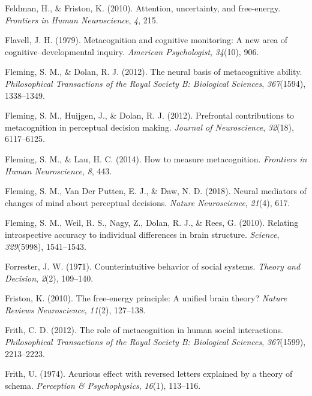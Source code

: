 \documentclass[12pt,twoside]{reedthesis}
\begin{document}
\leavevmode\hypertarget{ref-feldman2010attention}{}%
Feldman, H., \& Friston, K. (2010). Attention, uncertainty, and free-energy. \emph{Frontiers in Human Neuroscience}, \emph{4}, 215.

\leavevmode\hypertarget{ref-flavell1979metacognition}{}%
Flavell, J. H. (1979). Metacognition and cognitive monitoring: A new area of cognitive--developmental inquiry. \emph{American Psychologist}, \emph{34}(10), 906.

\leavevmode\hypertarget{ref-fleming2012neural}{}%
Fleming, S. M., \& Dolan, R. J. (2012). The neural basis of metacognitive ability. \emph{Philosophical Transactions of the Royal Society B: Biological Sciences}, \emph{367}(1594), 1338--1349.

\leavevmode\hypertarget{ref-fleming2012prefrontal}{}%
Fleming, S. M., Huijgen, J., \& Dolan, R. J. (2012). Prefrontal contributions to metacognition in perceptual decision making. \emph{Journal of Neuroscience}, \emph{32}(18), 6117--6125.

\leavevmode\hypertarget{ref-fleming2014measure}{}%
Fleming, S. M., \& Lau, H. C. (2014). How to measure metacognition. \emph{Frontiers in Human Neuroscience}, \emph{8}, 443.

\leavevmode\hypertarget{ref-fleming2018neural}{}%
Fleming, S. M., Van Der Putten, E. J., \& Daw, N. D. (2018). Neural mediators of changes of mind about perceptual decisions. \emph{Nature Neuroscience}, \emph{21}(4), 617.

\leavevmode\hypertarget{ref-fleming2010relating}{}%
Fleming, S. M., Weil, R. S., Nagy, Z., Dolan, R. J., \& Rees, G. (2010). Relating introspective accuracy to individual differences in brain structure. \emph{Science}, \emph{329}(5998), 1541--1543.

\leavevmode\hypertarget{ref-forrester1971counterintuitive}{}%
Forrester, J. W. (1971). Counterintuitive behavior of social systems. \emph{Theory and Decision}, \emph{2}(2), 109--140.

\leavevmode\hypertarget{ref-friston2010free}{}%
Friston, K. (2010). The free-energy principle: A unified brain theory? \emph{Nature Reviews Neuroscience}, \emph{11}(2), 127--138.

\leavevmode\hypertarget{ref-frith2012role}{}%
Frith, C. D. (2012). The role of metacognition in human social interactions. \emph{Philosophical Transactions of the Royal Society B: Biological Sciences}, \emph{367}(1599), 2213--2223.

\leavevmode\hypertarget{ref-frith1974acurious}{}%
Frith, U. (1974). Acurious effect with reversed letters explained by a theory of schema. \emph{Perception \& Psychophysics}, \emph{16}(1), 113--116.
\end{document}
